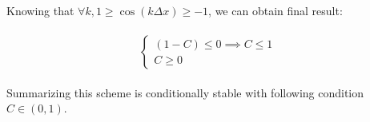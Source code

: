 	Knowing that $ \forall k,  1 \geq \cos(k\Delta x) \geq -1$, we can obtain final result:
	
	\begin{align}
		\begin{split}
			\begin{cases}
				(1-C) \leq 0 \implies C \leq 1 \\
				C \geq 0
			\end{cases}
		\end{split}
	\end{align} 
	
	Summarizing this scheme is conditionally stable with following condition $C \in \left(0, 1\right)$.
	
	
	